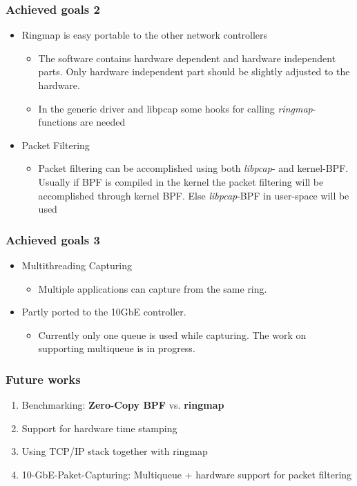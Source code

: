 \documentclass{beamer}
\begin{document}
\begin{frame}
\frametitle{Achieved goals 2}
\begin{itemize}
	\item Ringmap is easy portable to the other network controllers
		\begin{itemize}
			\item The software contains hardware dependent and hardware
				independent parts. Only hardware independent part should be
				slightly adjusted to the hardware. 
			\item In the generic driver and libpcap some hooks for calling
				\emph{ringmap}-functions are needed
		\end{itemize}
	\item Packet Filtering
		\begin{itemize}
			\item Packet filtering can be accomplished using both
				\emph{libpcap}- and kernel-BPF. Usually if BPF is compiled in
				the kernel the packet filtering will be accomplished through
				kernel BPF. Else \emph{libpcap}-BPF in user-space will be used
		\end{itemize}
\end{itemize}
\end{frame}
\begin{frame}
\frametitle{Achieved goals 3}
\begin{itemize}
	\item Multithreading Capturing
		\begin{itemize}
			\item Multiple applications can capture from the same ring. 
		\end{itemize}
	\item Partly ported to the 10GbE controller. 
		\begin{itemize}
			\item Currently only one queue is used while capturing. The work on
				supporting multiqueue is in progress.
		\end{itemize}
\end{itemize}
\end{frame}
\begin{frame}
\frametitle{Future works}
\begin{enumerate}
	\item Benchmarking:  \textbf{Zero-Copy BPF} vs. \textbf{ringmap}
	\item Support for hardware time stamping
	\item Using TCP/IP stack together with ringmap
	\item 10-GbE-Paket-Capturing: Multiqueue + hardware support for packet filtering 
\end{enumerate}
\end{frame}
\end{document}
